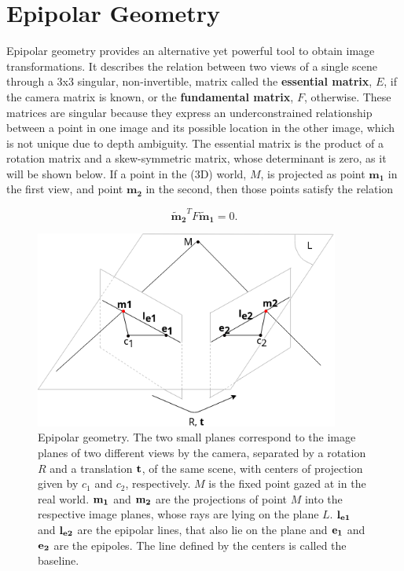 
\section{Epipolar Geometry}
\label{cha2:epipolar}

Epipolar geometry provides an alternative yet powerful tool to obtain image transformations. It describes the relation between two views of a single scene through a 3x3 singular, non-invertible, matrix called the \textbf{essential matrix}, \textbf{$E$}, if the camera matrix is known, or the \textbf{fundamental matrix}, \textbf{$F$}, otherwise. These matrices are singular because they express an underconstrained relationship between a point in one image and its possible location in the other image, which is not unique due to depth ambiguity. The essential matrix is the product of a rotation matrix and a skew-symmetric matrix, whose determinant is zero, as it will be shown below. If a point in the (3D) world, $M$, is projected as point $\mathbf{{m}_1}$ in the first view, and point $\mathbf{{m}_2}$ in the second, then those points satisfy the relation

\begin{equation}
\label{sec2:eq:epipolar}
\mathbf{\tilde{m}_2}^T F \mathbf{\tilde{m}_1} = 0.
\end{equation}

\begin{figure}[h]
	\centering
	\includegraphics[width=10cm]{images/epipolargeo.png}
	\caption[Epipolar geometry]{Epipolar geometry. The two small planes correspond to the image planes of two different views by the camera, separated by a rotation $R$ and a translation $\bf t$, of the same scene, with centers of projection given by $c_1$ and $c_2$, respectively. $M$ is the fixed point gazed at in the real world. $\bf m_1$ and $\bf m_2$ are the projections of point $M$ into the respective image planes, whose rays are lying on the plane $L$. $\bf l_{e1}$ and $\bf l_{e2}$ are the epipolar lines, that also lie on the plane and $\bf e_1$ and $\bf e_2$ are the epipoles. The line defined by the centers is called the baseline.}
	\label{sec2:fig:epipolargeo}
\end{figure}


